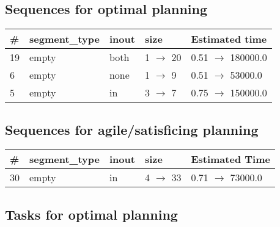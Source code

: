 \documentclass{article}
\begin{document}
                            \subsection*{Sequences for optimal planning}

                            \begin{center}
                            \begin{tabular}{@{}l|l|l|l|l@{}}
                            \# & segment\_type & inout & size & Estimated time\\\midrule
                            19&empty&both&1 $\rightarrow$ 20&0.51 $\rightarrow$ 180000.0\\
6&empty&none&1 $\rightarrow$ 9&0.51 $\rightarrow$ 53000.0\\
5&empty&in&3 $\rightarrow$ 7&0.75 $\rightarrow$ 150000.0
                            \end{tabular}
                            \end{center}
                    
                         \subsection*{Sequences for agile/satisficing planning}

                        \begin{center}
                        \begin{tabular}{@{}l|l|l|l|l@{}}
                        \# & segment\_type & inout & size & Estimated Time\\\midrule
                        30&empty&in&4 $\rightarrow$ 33&0.71 $\rightarrow$ 73000.0
                        \end{tabular}
                        \end{center}
                    
                                \subsection*{Tasks for optimal planning}
                                
\end{document}
